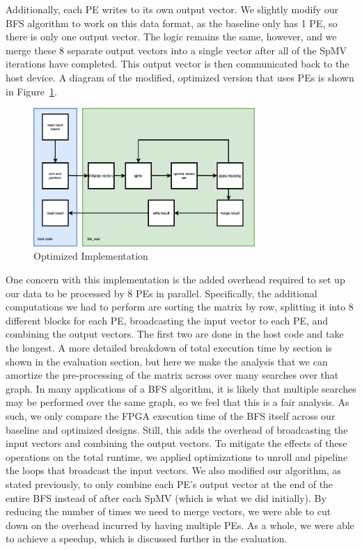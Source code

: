 \documentclass[10pt]{article}
\begin{document}
\noindent Additionally, each PE writes to its own output vector. We slightly modify our BFS algorithm to work
on this data format, as the baseline only has 1 PE, so there is only one output vector. The logic remains
the same, however, and we merge these 8 separate output vectors into a single vector after all of the
SpMV iterations have completed. This output vector is then communicated back to the host device. A diagram
of the modified, optimized version that uses PEs is shown in Figure~\ref{fig:bfs_opt}. \newline

\begin{figure}[h!]
  \centering
  \includegraphics[width=0.75\textwidth]{bfs_opt.png}
  \caption{Optimized Implementation}
  \label{fig:bfs_opt}
\end{figure}

\noindent One concern with this implementation is the added overhead required to set up
our data to be processed by 8 PEs in parallel. Specifically, the additional
computations we had to perform are sorting the matrix by row, splitting it into
8 different blocks for each PE, broadcasting the input vector to each PE, and
combining the output vectors. The first two are done in the host code and take
the longest. A more detailed breakdown of total execution time by section is
shown in the evaluation section, but here we make the analysis that we can
amortize the pre-processing of the matrix across over many searches over that
graph. In many applications of a BFS algorithm, it is likely that multiple
searches may be performed over the same graph, so we feel that this is a fair
analysis. As such, we only compare the FPGA execution time of the BFS itself
across our baseline and optimized designs. Still, this adds the overhead of
broadcasting the input vectors and combining the output vectors. To mitigate the
effects of these operations on the total runtime, we applied optimizations to
unroll and pipeline the loops that broadcast the input vectors. We also modified our algorithm,
as stated previously, to only combine each PE's output vector at the end of the entire BFS instead
of after each SpMV (which is what we did initially). By reducing the number of times we need to merge
vectors, we were able to cut down on the overhead incurred by having multiple PEs. As a whole, we 
were able to achieve a speedup, which is discussed further in the evaluation.
\end{document}
